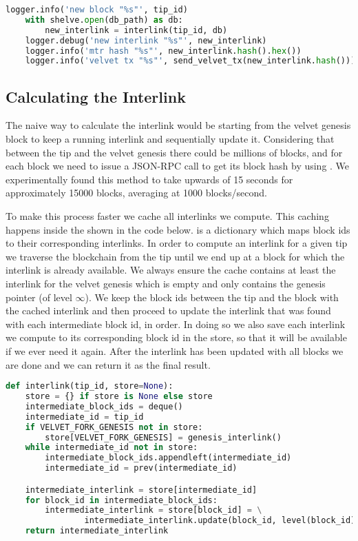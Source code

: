 \begin{lstlisting}[language=Python]
    logger.info('new block "%s"', tip_id)
    with shelve.open(db_path) as db:
        new_interlink = interlink(tip_id, db)
    logger.debug('new interlink "%s"', new_interlink)
    logger.info('mtr hash "%s"', new_interlink.hash().hex())
    logger.info('velvet tx "%s"', send_velvet_tx(new_interlink.hash()))
\end{lstlisting}

\subsection{Calculating the Interlink}

The naive way to calculate the interlink would be starting from the velvet genesis block to keep a running interlink and sequentially update it. Considering that between the tip and the velvet genesis there could be millions of blocks, and for each block we need to issue a JSON-RPC call to get its block hash by using . We experimentally found this method to take upwards of 15 seconds for approximately 15000 blocks, averaging at 1000 blocks/second.

To make this process faster we cache all interlinks we compute. This caching happens inside the  shown in the code below.  is a dictionary which maps block ids to their corresponding interlinks. In order to compute an interlink for a given tip we traverse the blockchain from the tip until we end up at a block for which the interlink is already available. We always ensure the cache contains at least the interlink for the velvet genesis which is empty and only contains the genesis pointer (of level $\infty$). We keep the block ids between the tip and the block with the cached interlink and then proceed to update the interlink that was found with each intermediate block id, in order. In doing so we also save each interlink we compute to its corresponding block id in the store, so that it will be available if we ever need it again. After the interlink has been updated with all blocks we are done and we can return it as the final result.

\begin{lstlisting}[language=Python]
def interlink(tip_id, store=None):
    store = {} if store is None else store
    intermediate_block_ids = deque()
    intermediate_id = tip_id
    if VELVET_FORK_GENESIS not in store:
        store[VELVET_FORK_GENESIS] = genesis_interlink()
    while intermediate_id not in store:
        intermediate_block_ids.appendleft(intermediate_id)
        intermediate_id = prev(intermediate_id)

    intermediate_interlink = store[intermediate_id]
    for block_id in intermediate_block_ids:
        intermediate_interlink = store[block_id] = \
                intermediate_interlink.update(block_id, level(block_id))
    return intermediate_interlink
\end{lstlisting}

